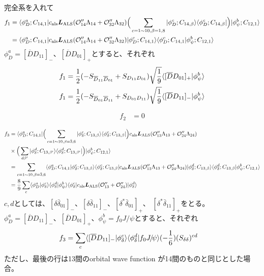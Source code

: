 \documentclass[a4j]{jarticle}
\def\bra{\langle}
\def\ket{\rangle}
\def\calO{{\cal O}}
\def\Jpsi{{J\!/\!\psi}{}}
\def\Dbar{\overline{{D}}{}}
\newcommand{\xbld}[1]{\mbox{\boldmath $#1$}}
\def\vecL{{\xbld{L}}}
\def\half#1{\text{${#1\over 2}$}}
\def\Lals{{\vecL_\text{ALS}}}
\begin{document}
完全系を入れて
\begin{align}
f_1&=\bra \phi_D^a;C_{14,1}|c_\text{als}\Lals(\calO''_{14}\Lambda_{14}+\calO''_{32}\Lambda_{32})
\Big(\sum_{c=1\sim 10,\beta=1,8}    |\phi_D^c;C_{14,\beta}\ket\bra\phi_D^c;C_{14,\beta}|\Big)
|\phi_\psi^b;C_{12,1}\ket
\\
&=\bra \phi_D^a;C_{14,1}|c_\text{als}\Lals(\calO''_{14}\Lambda_{14}+\calO''_{32}\Lambda_{32})
|\phi_D^c;C_{14,1}\ket\bra\phi_D^c;C_{14,1}|\phi_\psi^b;C_{12,1}\ket
\end{align}
$\phi_D^a=[\Dbar D_{11}]_-$、$[\Dbar D_{01}]_+$とすると、それぞれ
\begin{align}
f_1&=\half1 (-S_{\Dbar_{11}\Dbar_{01}}+S_{D_{11}D_{01}})\sqrt{1\over 9}\bra[\Dbar D_{01}]_+|\phi_\psi^b\ket 
\\
f_1&=\half1 (-S_{\Dbar_{01}\Dbar_{11}}+S_{D_{01}D_{11}})\sqrt{1\over 9}\bra[\Dbar D_{11}]_-|\phi_\psi^b\ket 
\end{align}

\begin{align}
f_2&=0
\end{align}

\begin{align}
f_3&=\bra \phi_D^a;C_{14,1}|
\Big(\sum_{c=1\sim 10,\beta=\bar3,6}|\phi_\delta^c;C_{13,\beta}\ket\bra\phi_\delta^c;C_{13,\beta}|\Big)
c_\text{als}\Lals(\calO''_{13}\Lambda_{13}+\calO''_{24}\Lambda_{24})
\nonumber\\
&\times\Big(\sum_{d\beta'}|\phi_\delta^d;C_{13,\beta'}\ket\bra\phi_\delta^d;C_{13,\beta'}|\Big)
|\phi_\psi^b;C_{12,1}\ket
\\
&=
\sum_{c=1\sim 10,\beta=\bar3,6}
\bra \phi_D^a;C_{14,1}|\phi_\delta^c;C_{13,\beta}\ket\bra\phi_\delta^c;C_{13,\beta}|
c_\text{als}\Lals(\calO''_{13}\Lambda_{13}+\calO''_{24}\Lambda_{24})
|\phi_\delta^d;C_{13,\beta}\ket\bra\phi_\delta^d;C_{13,\beta}
|\phi_\psi^b;C_{12,1}\ket
\\
&={8\over 9}\sum_c\bra\phi_D^a|\phi_\delta^c\ket\bra\phi_\delta^d|\phi_\psi^b\ket 
\bra\phi_\delta^c|c_\text{als}\Lals(\calO''_{13}+\calO''_{24})|\phi_\delta^d\ket
\end{align}
$c,d$としては、$[\delta\bar\delta_{01}]_-$、$[\delta\bar\delta_{11}]_-$、$[\delta^*\bar\delta_{01}]_+$、
$[\delta^*\bar\delta_{11}]_+$をとる。
$\phi_D^a=[\Dbar D_{11}]_-$、$[\Dbar D_{01}]_+$、$\phi_\psi^b=f_0\Jpsi$とすると、それぞれ
\begin{align}
f_3&=\sum_c\bra[\Dbar D_{11}]_-|\phi_\delta^c\ket\bra\phi_\delta^d|f_0\Jpsi\ket 
(-{1\over 6})(S_{\delta \delta})^{cd}
\end{align}
ただし、最後の行は13間のorbital wave function が14間のものと同じとした場合。
\end{document}
